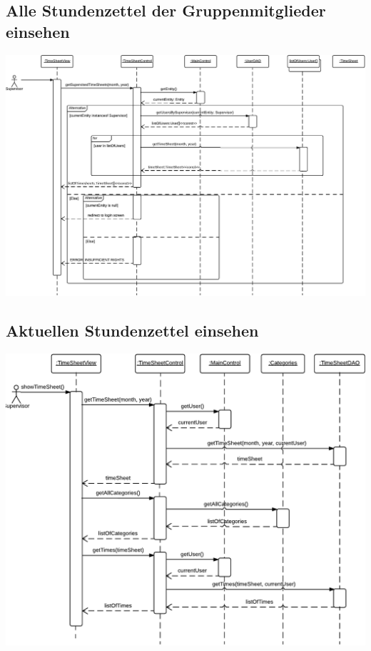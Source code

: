     \subsection{Alle Stundenzettel der Gruppenmitglieder einsehen}
        \includegraphics[width=\linewidth]{"Diagramms/sequenzes/timesheets_of_all_supervised.pdf"}\\
    \subsection{Aktuellen Stundenzettel einsehen}
        \includegraphics[width=\linewidth]{"Diagramms/sequenzes/current_timesheet.pdf"}\\
